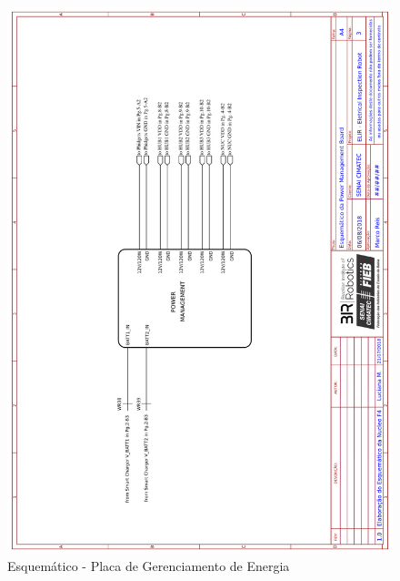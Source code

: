     \begin{figure}[H]
	\centering
	\includegraphics[width=14cm]{Figures/EsquematicoPMB.png}
	\caption{Esquemático - Placa de Gerenciamento de Energia} \label{PMB}
	\end{figure}
	
    \pagebreak
    

